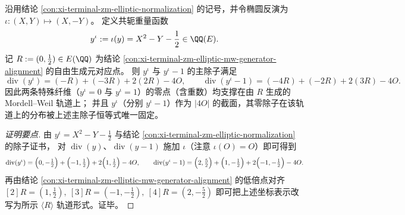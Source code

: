\begin{conclusion}\label{con:xi-terminal-zm-elliptic-conjugate-weight-principal-divisors}
沿用结论 \ref{con:xi-terminal-zm-elliptic-normalization} 的记号，并令椭圆反演为
\(
\iota:(X,Y)\mapsto(X,-Y)
\)。
定义共轭重量函数
\[
y^{\iota}:=\iota(y)=X^{2}-Y-\frac12\in\QQ(E).
\]
记 \(R:=(0,\tfrac12)\in E(\QQ)\) 为结论 \ref{con:xi-terminal-zm-elliptic-mw-generator-alignment} 的自由生成元对应点。
则 \(y^{\iota}\) 与 \(y^{\iota}-1\) 的主除子满足
\[
\operatorname{div}(y^{\iota})=(-R)+(-3R)+2(2R)-4O,
\qquad
\operatorname{div}(y^{\iota}-1)=(-4R)+(-2R)+2(3R)-4O.
\]
因此两条特殊纤维（\(y^{\iota}=0\) 与 \(y^{\iota}=1\)）的零点（含重数）均支撑在由 \(R\) 生成的 Mordell--Weil 轨道上；
并且 \(y^{\iota}\)（分别 \(y^{\iota}-1\)）作为 \(|4O|\) 的截面，其零除子在该轨道上的分布被上述主除子恒等式唯一固定。
\end{conclusion}
\begin{proof}[证明要点]
由 \(y^{\iota}=X^{2}-Y-\tfrac12\) 与结论 \ref{con:xi-terminal-zm-elliptic-normalization} 的除子证书，
对 \(\operatorname{div}(y)\)、\(\operatorname{div}(y-1)\) 施加 \(\iota\)（注意 \(\iota(O)=O\)）即可得到
\[
\operatorname{div}(y^{\iota})=\Bigl(0,-\tfrac12\Bigr)+\Bigl(-1,\tfrac12\Bigr)+2\Bigl(1,\tfrac12\Bigr)-4O,
\qquad
\operatorname{div}(y^{\iota}-1)=\Bigl(2,\tfrac52\Bigr)+\Bigl(1,-\tfrac12\Bigr)+2\Bigl(-1,-\tfrac12\Bigr)-4O.
\]
再由结论 \ref{con:xi-terminal-zm-elliptic-mw-generator-alignment} 的低倍点对齐
\(
[2]R=(1,\tfrac12),\ [3]R=(-1,-\tfrac12),\ [4]R=(2,-\tfrac52)
\)
即可把上述坐标表示改写为所示 \(\langle R\rangle\) 轨道形式。证毕。
\end{proof}

